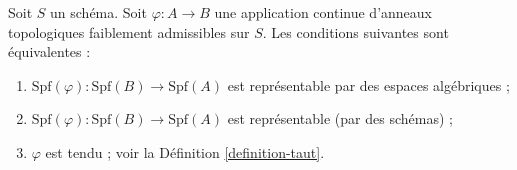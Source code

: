 \begin{lemma}
\label{lemma-representable-affine}
Soit $S$ un schéma. Soit $\varphi : A \to B$ une application continue
d'anneaux topologiques faiblement admissibles sur $S$. Les conditions suivantes
sont équivalentes :
\begin{enumerate}
\item $\text{Spf}(\varphi) : \text{Spf}(B) \to \text{Spf}(A)$
est représentable par des espaces algébriques ;
\item $\text{Spf}(\varphi) : \text{Spf}(B) \to \text{Spf}(A)$
est représentable (par des schémas) ;
\item $\varphi$ est tendu ; voir la Définition \ref{definition-taut}.
\end{enumerate}
\end{lemma}

